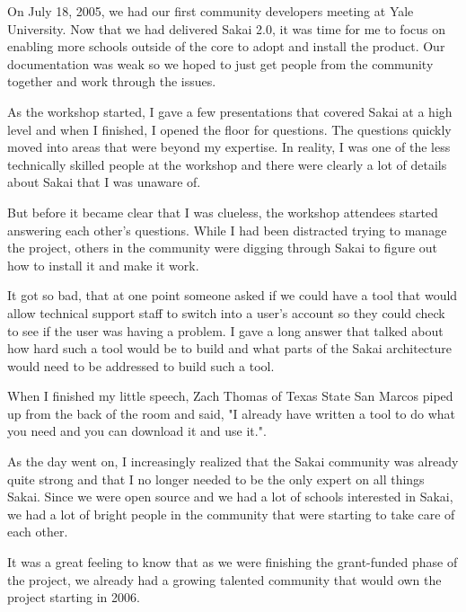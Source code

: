 \documentclass[12pt]{book}
\begin{document}
On July 18, 2005, we had our first community developers meeting
at Yale University.  Now that we had delivered Sakai 2.0,
it was time for me to focus on enabling more schools
outside of the core to adopt and install the product.  Our
documentation was weak so we hoped to just get people
from the community together and work through the issues.

As the workshop started, I gave a few presentations
that covered Sakai at a high level and when I finished,
I opened the floor for questions.  The questions quickly
moved into areas that were beyond my expertise. In reality,
I was one of the less technically skilled people at the
workshop and there were clearly a lot of details about
Sakai that I was unaware of.

But before it became clear that I was clueless,
the workshop attendees started answering each other's
questions.   While I had been distracted trying to manage
the project, others in the community were digging through Sakai
to figure out how to install it and make it work.

It got so bad, that at one point someone asked if we could
have a tool that would allow technical support staff to
switch into a user's account so they could check to see
if the user was having a problem.   I gave a long answer
that talked about how hard such a tool would be to build
and what parts of the Sakai architecture would need to be
addressed to build such a tool.

When I finished my little speech, Zach Thomas of Texas
State San Marcos piped up from the back of the room and
said, "I already have written a tool to do what
you need and you can download it and use it.".

As the day went on, I increasingly realized that the
Sakai community was already quite strong and that
I no longer needed to be the only
expert on all things Sakai.   Since we were open
source and we had a lot of schools interested in Sakai,
we had a lot of bright people in the community that
were starting to take care of each other.

It was a great feeling to know that as we were
finishing the grant-funded phase of the project,
we already had a growing talented community that
would own the project starting in 2006.
\end{document}
